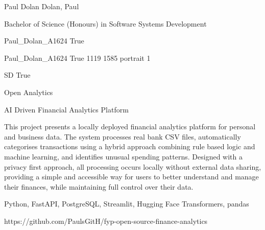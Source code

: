 
\begingroup{}\relax



\def\Key{Paul_Dolan_A1624}

{Paul Dolan}
{Dolan, Paul}

{Bachelor of Science (Honours) in Software Systems Development}

{Paul_Dolan_A1624}
{True}

{Paul_Dolan_A1624}
{True}
{1119}
{1585}
{portrait}
{1}

{SD}
{True}

{Open Analytics}

{AI Driven Financial Analytics Platform}

{This project presents a locally deployed financial analytics platform for personal and business data. The system processes real bank CSV files, automatically categorises transactions using a hybrid approach combining rule based logic and machine learning, and identifies unusual spending patterns. Designed with a privacy first approach, all processing occurs locally without external data sharing, providing a simple and accessible way for users to better understand and manage their finances, while maintaining full control over their data.}

{Python, FastAPI, PostgreSQL, Streamlit, Hugging Face Transformers, pandas}

{https://github.com/PaulsGitH/fyp-open-source-finance-analytics}


